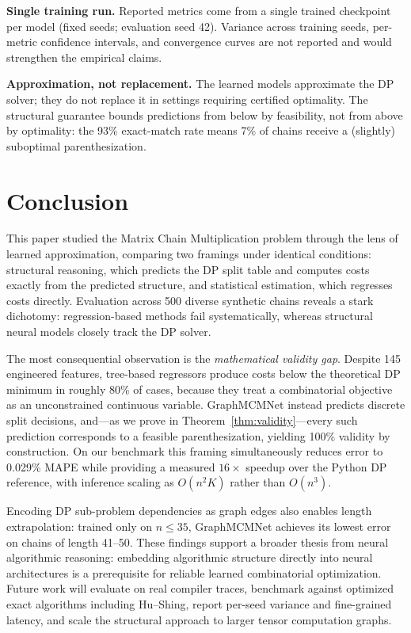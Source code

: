 \documentclass[conference]{IEEEtran}
\begin{document}
\textbf{Single training run.} Reported metrics come from a single trained
checkpoint per model (fixed seeds; evaluation seed 42). Variance across
training seeds, per-metric confidence intervals, and convergence curves are
not reported and would strengthen the empirical claims.

\textbf{Approximation, not replacement.} The learned models approximate the DP
solver; they do not replace it in settings requiring certified optimality.
The structural guarantee bounds predictions from below by feasibility, not
from above by optimality: the 93\% exact-match rate means 7\% of chains
receive a (slightly) suboptimal parenthesization.

\section{Conclusion}
This paper studied the Matrix Chain Multiplication problem through the lens of
learned approximation, comparing two framings under identical conditions:
structural reasoning, which predicts the DP split table and computes costs
exactly from the predicted structure, and statistical estimation, which
regresses costs directly. Evaluation across 500 diverse synthetic chains
reveals a stark dichotomy: regression-based methods fail systematically,
whereas structural neural models closely track the DP solver.

The most consequential observation is the \emph{mathematical validity gap}.
Despite 145 engineered features, tree-based regressors produce costs below the
theoretical DP minimum in roughly 80\% of cases, because they treat a
combinatorial objective as an unconstrained continuous variable. GraphMCMNet
instead predicts discrete split decisions, and---as we prove in
Theorem~\ref{thm:validity}---every such prediction corresponds to a feasible
parenthesization, yielding 100\% validity by construction. On our benchmark
this framing simultaneously reduces error to 0.029\% MAPE while providing a
measured $16\times$ speedup over the Python DP reference, with inference
scaling as $O(n^2 K)$ rather than $O(n^3)$.

Encoding DP sub-problem dependencies as graph edges also enables length
extrapolation: trained only on $n \le 35$, GraphMCMNet achieves its lowest
error on chains of length 41--50. These findings support a broader thesis from
neural algorithmic reasoning: embedding algorithmic structure directly into
neural architectures is a prerequisite for reliable learned combinatorial
optimization. Future work will evaluate on real compiler traces, benchmark
against optimized exact algorithms including Hu--Shing, report per-seed
variance and fine-grained latency, and scale the structural approach to
larger tensor computation graphs.
\end{document}
